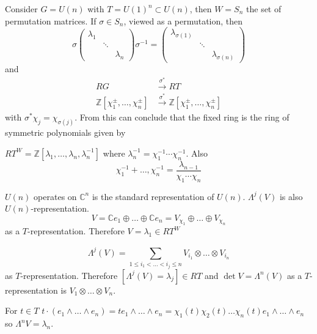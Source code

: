 \documentclass[11pt,a4paper]{scrarticle}
\theoremstyle{definition}
\theoremstyle{greenbox}
\newcommand{\Z}{\mathbb{Z}}
\newcommand{\C}{\mathbb{C}}
\begin{document}
\begin{example}
    Consider $ G = U(n) $ with $ T = U(1)^{n} \subset U(n) $, then $ W = S_{n} $ the set of permutation matrices. If $ \sigma \in S_{n} $, viewed as a permutation, then 
    \[ \sigma\begin{pmatrix}
        \lambda_{1} & & \\
        & \ddots & \\
        & &  \lambda_{n}
    \end{pmatrix} \sigma^{-1} = \begin{pmatrix}
    \lambda_{\sigma(1)} & & \\
    & \ddots & \\
    & &  \lambda_{\sigma(n)}
\end{pmatrix}\]
    and 
    \begin{align*}
        RG & \xrightarrow{\sigma^{*}} RT \\
        \Z[\chi_{1}^{\pm}, \dots, \chi_{n}^{\pm}] & \xrightarrow{\sigma^{*}} \Z[\chi_{1}^{\pm}, \dots, \chi_{n}^{\pm}]
    \end{align*}
    with $ \sigma^{*}\chi_{j} = \chi_{\sigma(j)}  $. From this can conclude that the fixed ring is the ring of symmetric polynomials given by \begin{lemma}
        $ RT^{W} = \Z[\lambda_{1}, \dots, \lambda_{n}, \lambda_{n}^{-1}] $ where $ \lambda_{n}^{-1} = \chi_{1}^{-1} \cdots \chi_{n}^{-1} $. Also 
        \[ \chi_{1}^{-1}+ \dots , \chi_{n}^{-1} = \frac{\lambda_{n-1}}{\chi_{1} \cdots \chi_{n}} \]
        
    \end{lemma}
    $ U(n) $ operates on $ \C^{n} $ is the standard representation of $ U(n) $. $ \Lambda^{j}(V) $ is also $ U(n) $-representation. 
    \[ V = \C e_{1} \oplus \dots \oplus \C e_{n} = V_{\chi_{1}} \oplus \dots \oplus V_{\chi_{n}} \]
    as a $ T $-representation. Therefore $ V = \lambda_{1} \in RT^{W} $ 

    
    \[ \Lambda^{j}(V) = \sum_{1 \le i_{1} < \dots < i_{j} \le n}^{} V_{i_{1}} \otimes \dots \otimes V_{i_{n}} \]
    as $ T $-representation. Therefore $ [\Lambda^{j}(V) = \lambda_{j}]  \in RT$ and $ \det V = \Lambda^{n}(V   ) $ as a $ T $-representation is $ V_{1} \otimes \dots \otimes V_{n} $. 

    For $ t \in T $ $ t \cdot (e_{1} \wedge \dots \wedge e_{n}) = t e_{1} \wedge \dots \wedge e_{n}  = \chi_{1}(t) \chi_{2}(t) \dots \chi_{n}(t) e_{1} \wedge \dots \wedge e_{n}$ so $ \Lambda^{n}V = \lambda_{n} $. 
    

\end{example}
\end{document}

